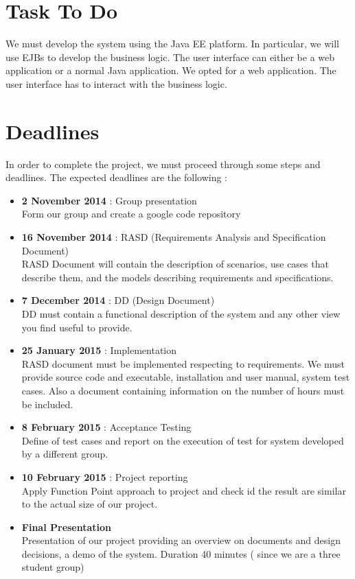 \documentclass[12pt]{book}
\begin{document}
\section{Task To Do}
We must develop the system using the Java EE platform. In particular, we will use EJBs to develop the business logic. The user interface can either be a web application or a normal Java application. We opted for a web application.  The user interface has to interact with the business logic.

\section{Deadlines}
In order to complete the project, we must proceed through some steps and deadlines. The expected deadlines are the following : 

\begin{itemize}
	\item	\textbf{2 November 2014} : Group presentation\\
		Form our group and create a google code repository
	\item \textbf{16 November 2014} : RASD (Requirements Analysis and Specification Document)\\
		RASD Document will contain the description of scenarios, use cases that describe them, and the models describing requirements and specifications.
	\item \textbf{7 December 2014} : DD (Design Document) \\
		DD must contain a functional description of the system and any other view you find useful to provide. 
	\item \textbf{25 January 2015} : Implementation \\
		RASD document must be implemented respecting to requirements. We must provide source code and executable, installation and user manual, system test cases. Also a document containing information on the number of hours must be included. 
	\item \textbf{8 February 2015} : Acceptance Testing \\
		Define of test cases and report on the execution of test for system developed by a different group. 
	\item \textbf{10 February 2015} : Project reporting \\
		Apply Function Point approach to project and check id the result are similar to the actual size of our project. 
	\item \textbf{Final Presentation}\\
		Presentation of our project providing an overview on documents and design decisions, a demo of the system. Duration 40 minutes ( since we are a three student group)
\end{itemize}
\end{document}
